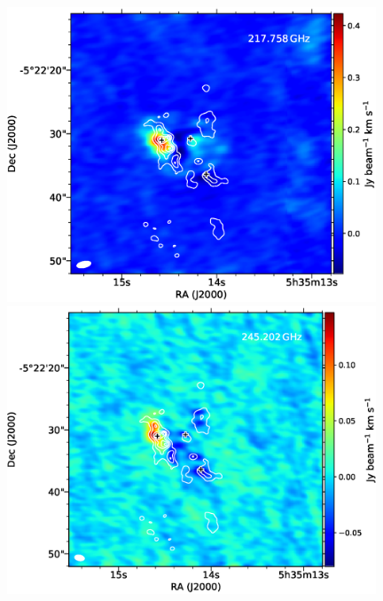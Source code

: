 \newpage
\begin{figure}[H] 
\begin{center}
\begin{minipage}{0.98\textwidth} 
\begin{center}
\begin{minipage}{0.48\textwidth}
\begin{center}
\includegraphics[width=0.98\textwidth]{OrionKL/mom0/217.758mom0_3-7.eps}
\end{center}
\end{minipage}
\begin{minipage}{0.48\textwidth}
\begin{center}
\includegraphics[width=0.98\textwidth]{OrionKL/mom0/245.202mom0_3-7.eps}
\end{center}
\end{minipage}
\end{center}
\end{minipage}


\end{center}
\end{figure}
